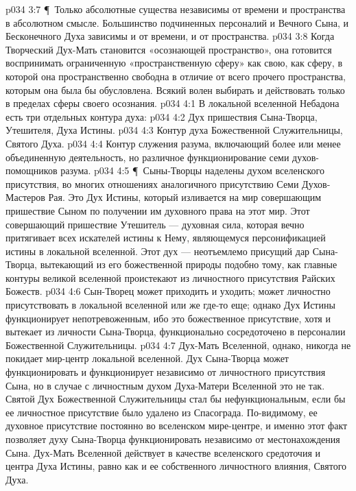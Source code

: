 \vs p034 3:7 \P\ Только абсолютные существа независимы от времени и пространства в абсолютном смысле. Большинство подчиненных персоналий и Вечного Сына, и Бесконечного Духа зависимы и от времени, и от пространства.
\vs p034 3:8 Когда Творческий Дух\hyp{}Мать становится «осознающей пространство», она готовится воспринимать ограниченную «пространственную сферу» как свою, как сферу, в которой она пространственно свободна в отличие от всего прочего пространства, которым она была бы обусловлена. Всякий волен выбирать и действовать только в пределах сферы своего осознания.
\vs p034 4:1 В локальной вселенной Небадона есть три отдельных контура духа:
\vs p034 4:2 \bibnobreakspace Дух пришествия Сына\hyp{}Творца, Утешителя, Духа Истины.
\vs p034 4:3 \bibnobreakspace Контур духа Божественной Служительницы, Святого Духа.
\vs p034 4:4 \bibnobreakspace Контур служения разума, включающий более или менее объединенную деятельность, но различное функционирование семи духов\hyp{}помощников разума.
\vs p034 4:5 \P\ Сыны\hyp{}Творцы наделены духом вселенского присутствия, во многих отношениях аналогичного присутствию Семи Духов\hyp{}Мастеров Рая. Это Дух Истины, который изливается на мир совершающим пришествие Сыном по получении им духовного права на этот мир. Этот совершающий пришествие Утешитель --- духовная сила, которая вечно притягивает всех искателей истины к Нему, являющемуся персонификацией истины в локальной вселенной. Этот дух --- неотъемлемо присущий дар Сына\hyp{}Творца, вытекающий из его божественной природы подобно тому, как главные контуры великой вселенной проистекают из личностного присутствия Райских Божеств.
\vs p034 4:6 Сын\hyp{}Творец может приходить и уходить; может личностно присутствовать в локальной вселенной или же где\hyp{}то еще; однако Дух Истины функционирует непотревоженным, ибо это божественное присутствие, хотя и вытекает из личности Сына\hyp{}Творца, функционально сосредоточено в персоналии Божественной Служительницы.
\vs p034 4:7 Дух\hyp{}Мать Вселенной, однако, никогда не покидает мир\hyp{}центр локальной вселенной. Дух Сына\hyp{}Творца может функционировать и функционирует независимо от личностного присутствия Сына, но в случае с личностным духом Духа\hyp{}Матери Вселенной это не так. Святой Дух Божественной Служительницы стал бы нефункциональным, если бы ее личностное присутствие было удалено из Спасограда. По\hyp{}видимому, ее духовное присутствие постоянно во вселенском мире\hyp{}центре, и именно этот факт позволяет духу Сына\hyp{}Творца функционировать независимо от местонахождения Сына. Дух\hyp{}Мать Вселенной действует в качестве вселенского средоточия и центра Духа Истины, равно как и ее собственного личностного влияния, Святого Духа.
